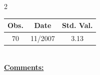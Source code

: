 
\bigskip 
\begin{multicols}{2}{ 
\begin{tabular}{ccc}
\hline  Obs.  &  Date &  Std. Val. \\ 
\hline 
                       70 &       11/2007 &          3.13 \vspace{-.12in} \\  
 \end{tabular} 
\\ 
 \columnbreak 
 \singlespacing 
 \underline{\textbf{Comments:}} \\ 
 \bigskip       

 } 
\end{multicols} 
